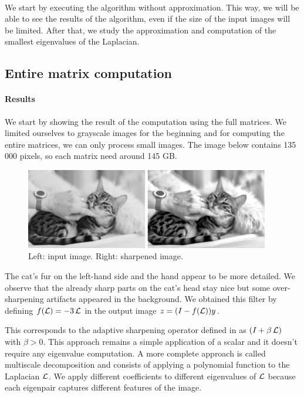 \paragraph{}
We start by executing the algorithm without approximation.
This way, we will be able to see the results of the algorithm, even if the size of the input images will be limited.
After that, we study the approximation and computation of the smallest eigenvalues of the Laplacian.

\subsection{Entire matrix computation}

\paragraph{Results}
We start by showing the result of the computation using the full matrices.
We limited ourselves to grayscale images for the beginning and for computing the entire matrices, we can only process small images.
The image below contains 135 000 pixels, so each matrix need around 145 GB.

\begin{figure}[H]
  \centering
  \includegraphics[width=0.95\textwidth]{img/cat.png}
  \caption{Left: input image. Right: sharpened image.}
\end{figure}

The cat's fur on the left-hand side and the hand appear to be more detailed.
We observe that the already sharp parts on the cat's head stay nice but some over-sharpening artifacts appeared in the background.
We obtained this filter by defining \(f(\operatorname{\mathcal{L}}) = -3\operatorname{\mathcal{L}}\) in the output image \(z = (I - f(\operatorname{\mathcal{L}}))y\).

This corresponds to the adaptive sharpening operator defined in \cite{siam_slides_2016} as \((I + \beta \operatorname{\mathcal{L}})\) with \(\beta > 0\).
This approach remains a simple application of a scalar and it doesn't require any eigenvalue computation.
A more complete approach is called multiscale decomposition \cite{talebi_nonlocal_2014} and consists of applying a polynomial function to the Laplacian \(\operatorname{\mathcal{L}}\).
We apply different coefficients to different eigenvalues of \(\operatorname{\mathcal{L}}\) because each eigenpair captures different features of the image.

